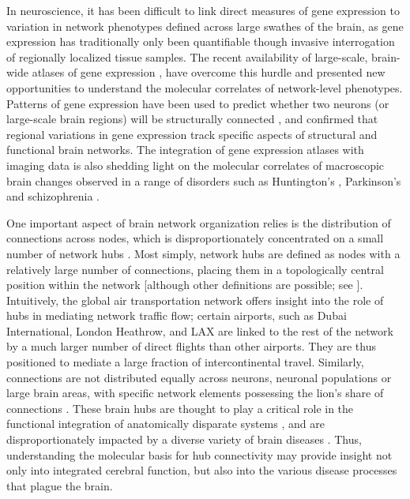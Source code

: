 In neuroscience, it has been difficult to link direct measures of gene expression to variation in network phenotypes defined across large swathes of the brain, as gene expression has traditionally only been quantifiable though invasive interrogation of regionally localized tissue samples. 
The recent availability of large-scale, brain-wide atlases of gene expression \citep{Lein2007a,Hawrylycz2012}, have overcome this hurdle and presented new opportunities to understand the molecular correlates of network-level phenotypes. Patterns of gene expression have been used to predict whether two neurons (or large-scale brain regions) will be structurally connected \citep{Varadan2006,Kaufman2006,Baruch2008,Wolf2011,French2011,Ji2014,Fakhry2015a}, and confirmed that regional variations in gene expression track specific aspects of structural \citep{Goel2014,Forest2017,Parkes2017,Romero-Garcia2018} and functional \citep{Cioli2014b,Richiardi2015,Hawrylycz2015,Krienen2016,Anderson2018} brain networks. The integration of gene expression atlases with imaging data is also shedding light on the molecular correlates of macroscopic brain changes observed in a range of disorders such as Huntington’s \citep{McColgan2018}, Parkinson’s \citep{Rittman2016} and schizophrenia \citep{Romme2017}.  

One important aspect of brain network organization relies is the distribution of connections across nodes, which is disproportionately concentrated on a small number of network hubs \citep{VandenHeuvel2011,Towlson2013}. Most simply, network hubs are defined as nodes with a relatively large number of connections, placing them in a topologically central position within the network [although other definitions are possible; see \citep{Power2011,Oldham}]. 
Intuitively, the global air transportation network offers insight into the role of hubs in mediating network traffic flow; certain airports, such as Dubai International, London Heathrow, and LAX are linked to the rest of the network by a much larger number of direct flights than other airports. They are thus positioned to mediate a large fraction of intercontinental travel. Similarly, connections are not distributed equally across neurons, neuronal populations or large brain areas, with specific network elements possessing the lion’s share of connections \citep{VandenHeuvel2011,Towlson2013,DeReus2014,VandenHeuvel2016}. 
These brain hubs are thought to play a critical role in the functional integration of anatomically disparate systems \citep{Harriger2012,VandenHeuvel2012}, and are disproportionately impacted by a diverse variety of brain diseases \citep{Crossley2014,Fornito2015}. Thus, understanding the molecular basis for hub connectivity may provide insight not only into integrated cerebral function, but also into the various disease processes that plague the brain.

